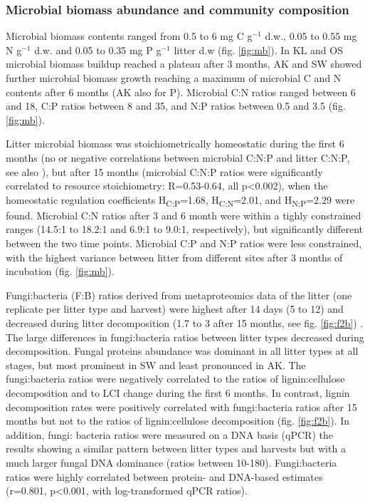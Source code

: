 \subsubsection*{Microbial biomass abundance and community composition}
Microbial biomass contents ranged from 0.5 to 6 mg C g$^{-1}$ d.w., 0.05 to 0.55 mg N g$^{-1}$ d.w. and 0.05 to 0.35 mg P g$^{-1}$ litter d.w (fig. \ref{fig:mb}). In KL and OS microbial biomass buildup reached a plateau after 3 months, AK and SW showed further microbial biomass growth reaching a maximum of microbial C and N contents after 6 months (AK also for P). Microbial C:N ratios ranged between 6 and 18, C:P ratios between 8 and 35, and N:P ratios between 0.5 and 3.5 (fig. \ref{fig:mb}).

Litter microbial biomass was stoichiometrically homeostatic during the first 6 months (no or negative correlations between microbial C:N:P and litter C:N:P, see also \cite{Mooshammer2011}), but after 15 months (microbial C:N:P ratios were significantly correlated to resource stoichiometry: R=0.53-0.64, all p\textless 0.002), when the homeostatic regulation coefficients \cite{Sterner2002} H\textsubscript{C:P}=1.68, H\textsubscript{C:N}=2.01, and H\textsubscript{N:P}=2.29 were found. Microbial C:N ratios after 3 and 6 month were within a tighly constrained ranges (14.5:1 to 18.2:1 and 6.9:1 to 9.0:1, respectively), but significantly different between the two time points. Microbial C:P and N:P ratios were less constrained, with the highest variance between litter from different sites after 3 months of incubation (fig. \ref{fig:mb}).

Fungi:bacteria (F:B) ratios derived from metaproteomics data of the litter (one replicate per litter type and harvest) were highest after 14 days (5 to 12) and decreased during litter decomposition (1.7 to 3 after 15 months, see fig. \ref{fig:f2b}) . The large differences in fungi:bacteria ratios between litter types decreased during decomposition. Fungal proteins abundance was dominant in all litter types at all stages, but most prominent in SW and least pronounced in  AK. The fungi:bacteria ratios were negatively correlated to the ratios of lignin:cellulose decomposition and to LCI change during the first 6 months. In contrast, lignin decomposition rates were positively correlated with fungi:bacteria ratios after 15 months but not to the ratios of lignin:cellulose decomposition (fig. \ref{fig:f2b}). In addition, fungi: bacteria ratios were measured on a DNA basis (qPCR) the results showing a similar pattern between litter types and harvests but with a much larger fungal DNA dominance (ratios between 10-180). Fungi:bacteria ratios were highly correlated between protein- and DNA-based estimates (r=0.801, p\textless 0.001, with log-transformed qPCR ratios).

